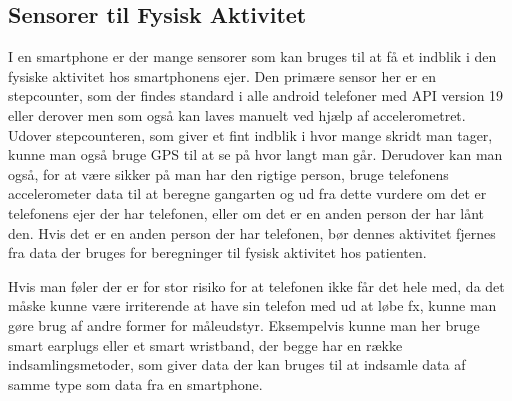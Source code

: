 
\subsection{Sensorer til Fysisk Aktivitet}
I en smartphone er der mange sensorer som kan bruges til at få et indblik i den fysiske aktivitet hos smartphonens ejer.
Den primære sensor her er en stepcounter, som der findes standard i alle android telefoner med API version 19 eller derover men som også kan laves manuelt ved hjælp af accelerometret.
Udover stepcounteren, som giver et fint indblik i hvor mange skridt man tager, kunne man også bruge GPS til at se på hvor langt man går.
Derudover kan man også, for at være sikker på man har den rigtige person, bruge telefonens accelerometer data til at beregne gangarten og ud fra dette vurdere om det er telefonens ejer der har telefonen, eller om det er en anden person der har lånt den.
Hvis det er en anden person der har telefonen, bør dennes aktivitet fjernes fra data der bruges for beregninger til fysisk aktivitet hos patienten.

Hvis man føler der er for stor risiko for at telefonen ikke får det hele med, da det måske kunne være irriterende at have sin telefon med ud at løbe fx, kunne man gøre brug af andre former for måleudstyr.
Eksempelvis kunne man her bruge smart earplugs eller et smart wristband, der begge har en række indsamlingsmetoder, som giver data der kan bruges til at indsamle data af samme type som data fra en smartphone.